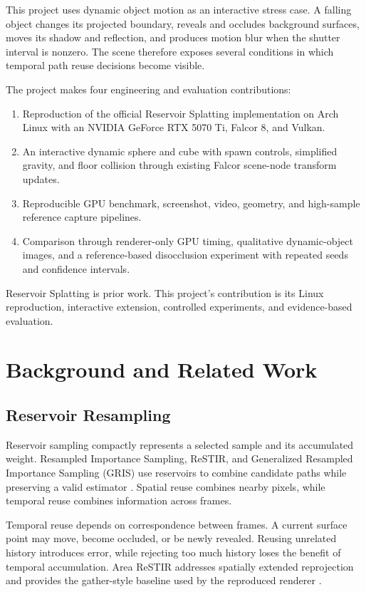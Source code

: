 \documentclass[10pt,twocolumn]{article}
\begin{document}
This project uses dynamic object motion as an interactive stress case. A
falling object changes its projected boundary, reveals and occludes background
surfaces, moves its shadow and reflection, and produces motion blur when the
shutter interval is nonzero. The scene therefore exposes several conditions
in which temporal path reuse decisions become visible.

The project makes four engineering and evaluation contributions:
\begin{enumerate}
    \item Reproduction of the official Reservoir Splatting implementation on
    Arch Linux with an NVIDIA GeForce RTX 5070 Ti, Falcor 8, and Vulkan.
    \item An interactive dynamic sphere and cube with spawn controls,
    simplified gravity, and floor collision through existing Falcor
    scene-node transform updates.
    \item Reproducible GPU benchmark, screenshot, video, geometry, and
    high-sample reference capture pipelines.
    \item Comparison through renderer-only GPU timing, qualitative
    dynamic-object images, and a reference-based disocclusion experiment with
    repeated seeds and confidence intervals.
\end{enumerate}

Reservoir Splatting is prior work. This project's contribution is its Linux
reproduction, interactive extension, controlled experiments, and
evidence-based evaluation.

\section{Background and Related Work}

\subsection{Reservoir Resampling}

Reservoir sampling compactly represents a selected sample and its accumulated
weight. Resampled Importance Sampling, ReSTIR, and Generalized Resampled
Importance Sampling (GRIS) use reservoirs to combine candidate paths while
preserving a valid estimator \cite{gris}. Spatial reuse combines nearby
pixels, while temporal reuse combines information across frames.

Temporal reuse depends on correspondence between frames. A current surface
point may move, become occluded, or be newly revealed. Reusing unrelated
history introduces error, while rejecting too much history loses the benefit
of temporal accumulation. Area ReSTIR addresses spatially extended
reprojection and provides the gather-style baseline used by the reproduced
renderer \cite{area-restir}.
\end{document}
